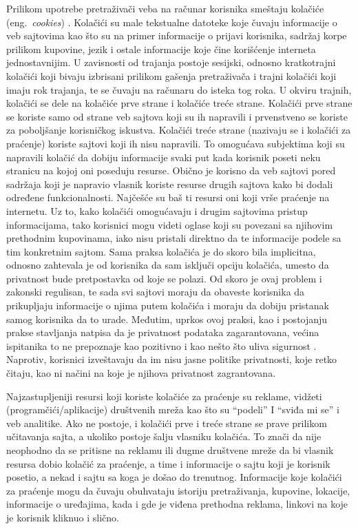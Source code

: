\documentclass[a4paper]{article}
\begin{document}
Prilikom upotrebe pretraživači veba na računar korisnika smeštaju kolačiće (eng.~{\em cookies}) \cite{cookies1}. Kolačići su male tekstualne datoteke koje čuvaju informacije o veb sajtovima kao što su na primer informacije o prijavi korisnika, sadržaj korpe prilikom  kupovine, jezik i ostale informacije koje čine korišćenje interneta jednostavnijim. U zavisnosti od trajanja postoje sesijski, odnosno kratkotrajni kolačići koji bivaju izbrisani prilikom gašenja pretraživača i trajni kolačići koji imaju rok trajanja, te se čuvaju na računaru do isteka tog roka. U okviru trajnih, kolačići se dele na kolačiće prve strane i kolačiće treće strane.  Kolačići prve strane se koriste samo od strane veb sajtova koji su ih napravili i prvenstveno se koriste za poboljšanje korisničkog iskustva. Kolačići treće strane (nazivaju se i kolačići za praćenje) koriste  sajtovi koji ih nisu napravili. To omogućava subjektima koji su napravili kolačić da dobiju informacije svaki put kada korisnik poseti neku stranicu na kojoj oni poseduju resurse. Obično je korisno da veb sajtovi pored sadržaja koji je napravio vlasnik koriste resurse drugih sajtova kako bi dodali određene  funkcionalnosti. Najčešće su baš ti resursi oni koji vrše praćenje na internetu. Uz to, kako kolačići omogućavaju i drugim sajtovima pristup informacijama, tako korisnici mogu videti oglase koji su povezani sa njihovim prethodnim kupovinama, iako nisu pristali direktno da te informacije podele sa tim konkretnim sajtom. Sama praksa kolačića je do skoro bila implicitna, odnosno zahtevala je od korisnika da sam isključi opciju kolačića, umesto da privatnost bude pretpostavka od koje se polazi. Od skoro je ovaj problem i zakonski regulisan, te sada svi sajtovi moraju da obaveste korisnika da prikupljaju informacije o njima putem kolačića i moraju da dobiju pristanak samog korisnika da to urade. Međutim, uprkos ovoj praksi, kao i postojanju prakse stavljanja natpisa da je privatnost podataka zagarantovana, većina ispitanika to ne prepoznaje kao pozitivno i kao nešto što uliva sigurnost \cite{cookies2}. Naprotiv, korisnici izveštavaju da im nisu jasne politike privatnosti, koje retko čitaju, kao ni načini na koje je njihova privatnost zagrantovana.
\par Najzastupljeniji resursi koji koriste kolačiće za praćenje su reklame, vidžeti (programčići/aplikacije) društvenih mreža kao što su “podeli” I “sviđa mi se” i veb analitike. Ako ne postoje, i kolačići prve i treće strane se prave prilikom učitavanja sajta, a ukoliko postoje šalju vlasniku kolačića. To znači da nije neophodno da se pritisne na reklamu ili dugme društvene mreže da bi vlasnik resursa dobio kolačić za praćenje, a time i informacije o sajtu koji je korisnik posetio, a nekad i sajtu sa koga je došao do trenutnog. Informacije koje kolačići za praćenje mogu da čuvaju obuhvataju istoriju pretraživanja, kupovine, lokacije, informacije o uređajima, kada i gde je viđena prethodna reklama, linkovi na koje je korisnik kliknuo i slično. 
\end{document}
